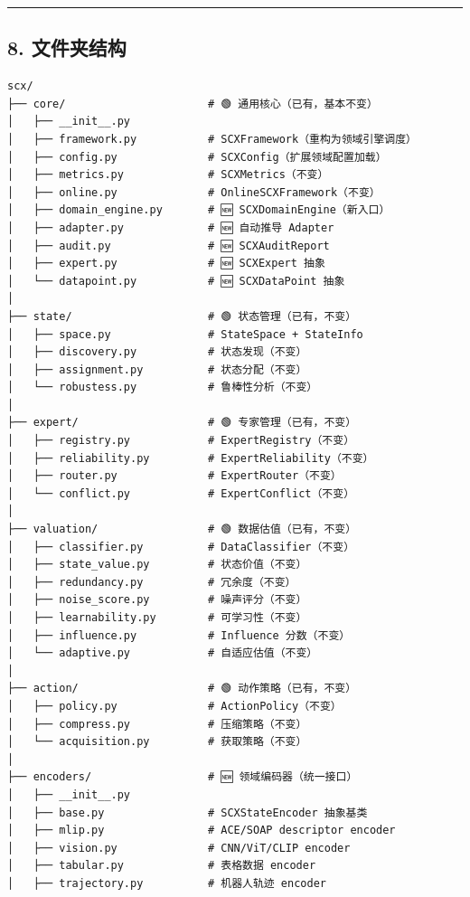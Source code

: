 \documentclass[
  12pt,
]{ctexart}
\begin{document}
\begin{center}\rule{0.5\linewidth}{0.5pt}\end{center}

\subsection{8. 文件夹结构}\label{ux6587ux4ef6ux5939ux7ed3ux6784}

\begin{verbatim}
scx/
├── core/                      # 🟢 通用核心（已有，基本不变）
│   ├── __init__.py
│   ├── framework.py           # SCXFramework（重构为领域引擎调度）
│   ├── config.py              # SCXConfig（扩展领域配置加载）
│   ├── metrics.py             # SCXMetrics（不变）
│   ├── online.py              # OnlineSCXFramework（不变）
│   ├── domain_engine.py       # 🆕 SCXDomainEngine（新入口）
│   ├── adapter.py             # 🆕 自动推导 Adapter
│   ├── audit.py               # 🆕 SCXAuditReport
│   ├── expert.py              # 🆕 SCXExpert 抽象
│   └── datapoint.py           # 🆕 SCXDataPoint 抽象
│
├── state/                     # 🟢 状态管理（已有，不变）
│   ├── space.py               # StateSpace + StateInfo
│   ├── discovery.py           # 状态发现（不变）
│   ├── assignment.py          # 状态分配（不变）
│   └── robustess.py           # 鲁棒性分析（不变）
│
├── expert/                    # 🟢 专家管理（已有，不变）
│   ├── registry.py            # ExpertRegistry（不变）
│   ├── reliability.py         # ExpertReliability（不变）
│   ├── router.py              # ExpertRouter（不变）
│   └── conflict.py            # ExpertConflict（不变）
│
├── valuation/                 # 🟢 数据估值（已有，不变）
│   ├── classifier.py          # DataClassifier（不变）
│   ├── state_value.py         # 状态价值（不变）
│   ├── redundancy.py          # 冗余度（不变）
│   ├── noise_score.py         # 噪声评分（不变）
│   ├── learnability.py        # 可学习性（不变）
│   ├── influence.py           # Influence 分数（不变）
│   └── adaptive.py            # 自适应估值（不变）
│
├── action/                    # 🟢 动作策略（已有，不变）
│   ├── policy.py              # ActionPolicy（不变）
│   ├── compress.py            # 压缩策略（不变）
│   └── acquisition.py         # 获取策略（不变）
│
├── encoders/                  # 🆕 领域编码器（统一接口）
│   ├── __init__.py
│   ├── base.py                # SCXStateEncoder 抽象基类
│   ├── mlip.py                # ACE/SOAP descriptor encoder
│   ├── vision.py              # CNN/ViT/CLIP encoder
│   ├── tabular.py             # 表格数据 encoder
│   ├── trajectory.py          # 机器人轨迹 encoder

\end{verbatim}
\end{document}
